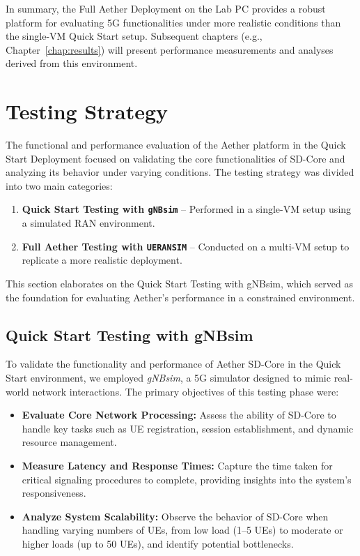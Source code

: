 In summary, the Full Aether Deployment on the Lab PC provides a robust platform for evaluating 5G functionalities under more realistic conditions than the single-VM Quick Start setup. Subsequent chapters (e.g., Chapter~\ref{chap:results}) will present performance measurements and analyses derived from this environment. 

\newpage
\section{Testing Strategy}
\label{sec:testing-strategy}

The functional and performance evaluation of the Aether platform in the Quick Start Deployment focused on validating the core functionalities of SD-Core and analyzing its behavior under varying conditions. 
The testing strategy was divided into two main categories:
\begin{enumerate}
    \item \textbf{Quick Start Testing with \texttt{gNBsim}} – Performed in a single-VM setup using a simulated RAN environment.
    \item \textbf{Full Aether Testing with \texttt{UERANSIM}} – Conducted on a multi-VM setup to replicate a more realistic deployment.
\end{enumerate}

This section elaborates on the Quick Start Testing with gNBsim, which served as the foundation for evaluating Aether’s performance in a constrained environment.

\subsection{Quick Start Testing with gNBsim}

To validate the functionality and performance of Aether SD-Core in the Quick Start environment, we employed \textit{gNBsim}, a 5G simulator designed to mimic real-world network interactions. The primary objectives of this testing phase were:

\begin{itemize}
    \item \textbf{Evaluate Core Network Processing:} Assess the ability of SD-Core to handle key tasks such as UE registration, session establishment, and dynamic resource management.
    \item \textbf{Measure Latency and Response Times:} Capture the time taken for critical signaling procedures to complete, providing insights into the system’s responsiveness.
    \item \textbf{Analyze System Scalability:} Observe the behavior of SD-Core when handling varying numbers of UEs, from low load (1--5 UEs) to moderate or higher loads (up to 50 UEs), and identify potential bottlenecks.
\end{itemize}

